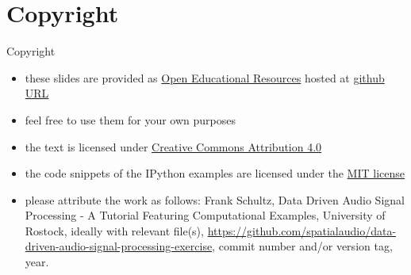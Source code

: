 \documentclass[mathserif, aspectratio=1610]{intbeamer}
\begin{document}





%
%
%





















\section{Copyright}
\begin{frame}{Copyright}
\begin{itemize}
\item these slides are provided as \href{https://en.wikipedia.org/wiki/Open_educational_resources}{Open Educational Resources} hosted at \href{https://github.com/spatialaudio/data-driven-audio-signal-processing-exercise}{github URL}
\item feel free to use them for your own purposes
\item the text is licensed under \href{https://creativecommons.org/licenses/by/4.0/}{Creative Commons Attribution 4.0}
\item the code snippets of the IPython examples are licensed under the \href{https://opensource.org/licenses/MIT}{MIT license}
\item please attribute the work as follows: Frank Schultz, Data Driven Audio Signal Processing - A Tutorial Featuring Computational Examples, University of Rostock,  ideally with relevant file(s), \href{https://github.com/spatialaudio/data-driven-audio-signal-processing-exercise}{https://github.com/spatialaudio/data-driven-audio-signal-processing-exercise}, commit number and/or version tag, year.
\end{itemize}

\end{frame}
%
\end{document}
